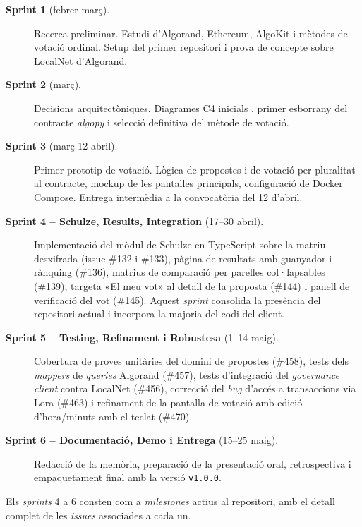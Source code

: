 \begin{description}
    \item[\textbf{Sprint 1} (febrer-març).] Recerca preliminar. Estudi
    d'Algorand, Ethereum, AlgoKit i mètodes de votació ordinal. Setup del
    primer repositori i prova de concepte sobre LocalNet d'Algorand.

    \item[\textbf{Sprint 2} (març).] Decisions arquitectòniques. Diagrames
    C4 inicials \cite{brown2018c4}, primer esborrany del contracte
    \emph{algopy} i selecció definitiva del mètode de votació.

    \item[\textbf{Sprint 3} (març-12 abril).] Primer prototip de votació.
    Lògica de propostes i de votació per pluralitat al contracte, mockup de
    les pantalles principals, configuració de Docker Compose. Entrega
    intermèdia a la convocatòria del 12 d'abril.

    \item[\textbf{Sprint 4 -- Schulze, Results, Integration}
    (17--30 abril).] Implementació del mòdul de Schulze en TypeScript
    sobre la matriu desxifrada (issue \#132 i \#133), pàgina de resultats
    amb guanyador i rànquing (\#136), matrius de comparació per parelles
    col·lapsables (\#139), targeta «El meu vot» al detall de la proposta
    (\#144) i panell de verificació del vot (\#145). Aquest \emph{sprint}
    consolida la presència del repositori actual i incorpora la majoria
    del codi del client.

    \item[\textbf{Sprint 5 -- Testing, Refinament i Robustesa}
    (1--14 maig).] Cobertura de proves unitàries del domini de propostes
    (\#458), tests dels \emph{mappers} de \emph{queries} Algorand (\#457),
    tests d'integració del \emph{governance client} contra LocalNet (\#456),
    correcció del \emph{bug} d'accés a transaccions via Lora (\#463) i
    refinament de la pantalla de votació amb edició d'hora/minuts amb el
    teclat (\#470).

    \item[\textbf{Sprint 6 -- Documentació, Demo i Entrega}
    (15--25 maig).] Redacció de la memòria, preparació de la presentació
    oral, retrospectiva i empaquetament final amb la versió \texttt{v1.0.0}.
\end{description}

Els \emph{sprints} 4 a 6 consten com a \emph{milestones} actius al
repositori, amb el detall complet de les \emph{issues} associades a cada un.


